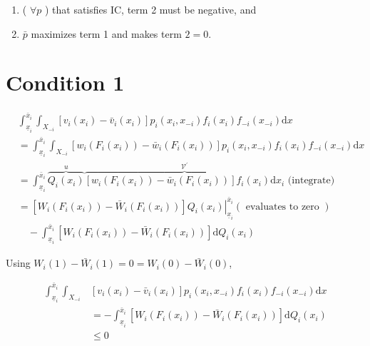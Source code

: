 \documentclass[10pt]{article}
\begin{document}
\begin{enumerate}
  \item ( $\forall p$ ) that satisfies IC, term 2 must be negative, and
  \item $\bar{p}$ maximizes term 1 and makes term $2=0$.
\end{enumerate}

\section*{Condition 1}
$$
\begin{aligned}
& \int_{\underline{x}_{i}}^{\bar{x}_{i}} \int_{X_{-i}}\left[v_{i}\left(x_{i}\right)-\bar{v}_{i}\left(x_{i}\right)\right] p_{i}\left(x_{i}, x_{-i}\right) f_{i}\left(x_{i}\right) f_{-i}\left(x_{-i}\right) \mathrm{d} x \\
& =\int_{\underline{x}_{i}}^{\bar{x}_{i}} \int_{X_{-i}}\left[w_{i}\left(F_{i}\left(x_{i}\right)\right)-\bar{w}_{i}\left(F_{i}\left(x_{i}\right)\right)\right] p_{i}\left(x_{i}, x_{-i}\right) f_{i}\left(x_{i}\right) f_{-i}\left(x_{-i}\right) \mathrm{d} x \\
& =\int_{\underline{x}_{i}}^{\bar{x}_{i}} \overbrace{Q_{i}\left(x_{i}\right)}^{u} \overbrace{\left[w_{i}\left(F_{i}\left(x_{i}\right)\right)-\bar{w}_{i}\left(F_{i}\left(x_{i}\right)\right)\right] f_{i}\left(x_{i}\right) \mathrm{d} x_{i}}^{\mathcal{V}^{\prime}} \text { (integrate) } \\
& =\left.\left[W_{i}\left(F_{i}\left(x_{i}\right)\right)-\bar{W}_{i}\left(F_{i}\left(x_{i}\right)\right)\right] Q_{i}\left(x_{i}\right)\right|_{\underline{x}_{i}} ^{\bar{x}_{i}}(\text { evaluates to zero }) \\
& \quad-\int_{\underline{x}_{i}}^{\bar{x}_{i}}\left[W_{i}\left(F_{i}\left(x_{i}\right)\right)-\bar{W}_{i}\left(F_{i}\left(x_{i}\right)\right)\right] \mathrm{d} Q_{i}\left(x_{i}\right)
\end{aligned}
$$

Using $W_{i}(1)-\bar{W}_{i}(1)=0=W_{i}(0)-\bar{W}_{i}(0)$,

$$
\begin{aligned}
\int_{\underline{x}_{i}}^{\bar{x}_{i}} \int_{X_{-i}} & {\left[v_{i}\left(x_{i}\right)-\bar{v}_{i}\left(x_{i}\right)\right] p_{i}\left(x_{i}, x_{-i}\right) f_{i}\left(x_{i}\right) f_{-i}\left(x_{-i}\right) \mathrm{d} x } \\
& =-\int_{\underline{x}_{i}}^{\bar{x}_{i}}\left[W_{i}\left(F_{i}\left(x_{i}\right)\right)-\bar{W}_{i}\left(F_{i}\left(x_{i}\right)\right)\right] \mathrm{d} Q_{i}\left(x_{i}\right) \\
& \leq 0
\end{aligned}
$$
\end{document}
